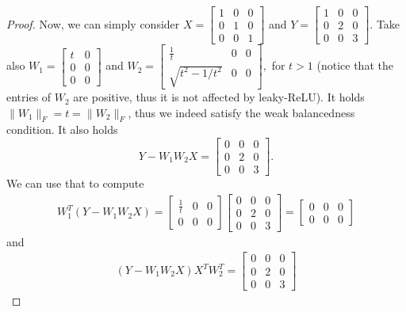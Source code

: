 \documentclass[a4paper,11pt]{article}
\newcommand{\1}{\mathbbm{1}}
\theoremstyle{plain}
\begin{document}
\begin{proof}
Now, we can simply consider $X = \begin{bmatrix}
        1 & 0 & 0 \\ 0 & 1 & 0 \\ 0 & 0 & 1
    \end{bmatrix}$
and
$Y = \begin{bmatrix}
        1 & 0 & 0 \\ 0 & 2 & 0 \\ 0 & 0 & 3
    \end{bmatrix}$.
Take also $W_1 = \begin{bmatrix}
        t & 0 \\ 0 & 0 \\ 0 & 0
    \end{bmatrix}$
    and 
    $W_2 = \begin{bmatrix}
       \frac{1}{t} & 0 & 0 \\ \sqrt{t^2 - 1/t^2} & 0 & 0   
    \end{bmatrix},$
for $t > 1$ (notice that the entries of $W_2$ are positive, thus it is not affected by leaky-ReLU). It holds $\|W_1\|_F = t = \|W_2\|_F$, thus we indeed satisfy the weak balancedness condition. It also holds
\begin{equation*}
 Y- W_1 W_2 X = \begin{bmatrix}
     0 & 0 & 0 \\ 0 & 2 & 0 \\ 0 & 0 & 3 
 \end{bmatrix}.   
\end{equation*}
We can use that to compute
\begin{align*}
    W_1^T (Y - W_1 W_2 X) = \begin{bmatrix}
       \frac{1}{t} & 0 & 0 \\ 0 & 0 & 0   
    \end{bmatrix} \begin{bmatrix}
     0 & 0 & 0 \\ 0 & 2 & 0 \\ 0 & 0 & 3 
 \end{bmatrix} = \begin{bmatrix}
     0 & 0 & 0 \\ 0 & 0 & 0
 \end{bmatrix}
\end{align*}
and 
\begin{align*}
    (Y - W_1 W_2 X) X^T W_2^T =
        \begin{bmatrix}
     0 & 0 & 0 \\ 0 & 2 & 0 \\ 0 & 0 & 3 

\end{bmatrix}
\end{align*}
\end{proof}
\end{document}
